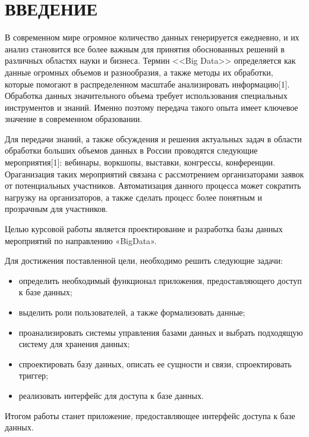 \section*{ВВЕДЕНИЕ}

В современном мире огромное количество данных генерируется ежедневно, и их анализ становится все более важным для принятия обоснованных решений в различных областях науки и бизнеса. Термин <<Big Data>> определяется как данные огромных объемов и
разнообразия, а также методы их обработки, которые помогают в
распределенном масштабе анализировать информацию[1]. Обработка данных значительного объема требует использования специальных инструментов и знаний. Именно поэтому передача такого опыта имеет ключевое значение в современном образовании.

Для передачи знаний, а также обсуждения и решения актуальных задач в области обработки больших объемов данных в России проводятся следующие мероприятия[1]: вебинары, воркшопы, выставки, конгрессы, конференции. Ораганизация таких мероприятий связана с рассмотрением организаторами заявок от потенциальных участников. Автоматизация данного процесса может сократить нагрузку на организаторов, а также сделать процесс более понятным и прозрачным для участников.

Целью курсовой работы является проектирование и разработка базы данных мероприятий по направлению «BigData».

Для достижения поставленной цели, необходимо решить следующие задачи:
\begin{itemize}[label=---]
	\item определить необходимый функционал приложения, предоставляющего доступ к базе данных;
	\item выделить роли пользователей, а также формализовать данные;
	\item проанализировать системы управления базами данных и выбрать подходящую систему для хранения данных;
	\item спроектировать базу данных, описать ее сущности и связи, спроектировать триггер;
	\item реализовать интерфейс для доступа к базе данных.
\end{itemize}

Итогом работы станет приложение, предоставляющее интерфейс доступа к базе данных.
\pagebreak
